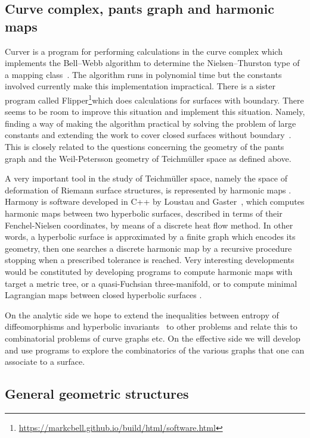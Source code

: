 \documentclass[14pt,fleqn]{article}
\begin{document}
\subsection{Curve complex, 
pants graph and harmonic maps}

Curver is a program for
performing calculations in the curve complex which implements the
Bell–Webb algorithm to determine the Nielsen–Thurston type of a
mapping class~\cite{b-c-17,b-esmt-19}. The algorithm runs in polynomial time but the constants
involved currently make this implementation impractical. There is a
sister program called Flipper\footnote{\url{https://markcbell.github.io/build/html/software.html}}which does calculations for surfaces
with boundary. There seems to be room to improve this situation and
implement this situation. Namely, finding a way of making the
algorithm practical by solving the problem of large constants and
extending the work to cover closed surfaces without boundary~\cite{mm-sosr-19}.
This is closely related to the questions 
concerning the geometry 
of the pants graph and the Weil-Petersson geometry of Teichm\"uller space
as defined above.

A very important tool in the study of Teichm\" {u}ller space, namely the
space of deformation of Riemann surface structures, is represented by
harmonic maps 
\cite{wolf} \cite{kajigaya2019uniformizing}. Harmony is  software developed in C++ by
Loustau and Gaster~\cite{glm-cdehm-18}, which computes harmonic maps between two
hyperbolic surfaces, 
described in terms of their Fenchel-Nielsen
coordinates, 
by means of a discrete heat flow method. In other words,
a hyperbolic surface is 
approximated by a finite graph 
which encodes its geometry, 
then one searches a discrete harmonic 
map by a  recursive procedure 
stopping when  a prescribed tolerance is reached. 
Very interesting developments would be
constituted by developing programs to compute harmonic maps with
target a metric tree, 
or a quasi-Fuchsian three-manifold, or to
compute minimal Lagrangian maps between closed hyperbolic surfaces \cite{BS}.


On the analytic side we hope to extend the
inequalities between entropy of diffeomorphisms and hyperbolic
invariants~\cite{km-nevvp-18} to other problems and relate this to combinatorial problems
of curve graphs etc. On the effective side we will develop and use
programs to explore the combinatorics of the various graphs that one
can associate to a surface.

\subsection{General geometric structures}
\end{document}
